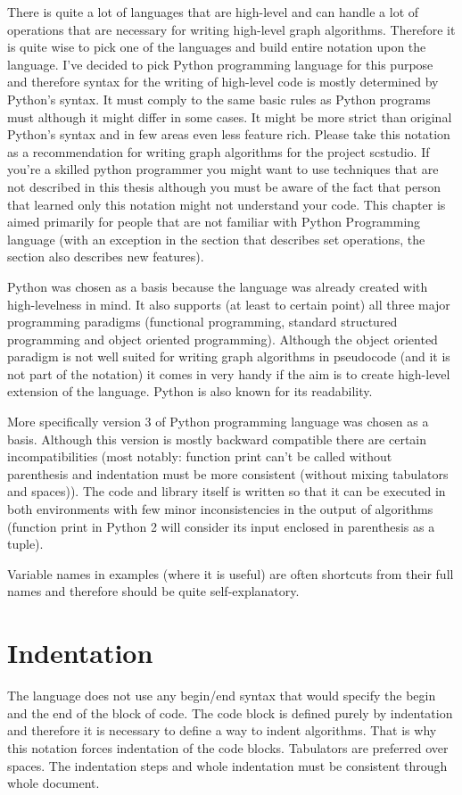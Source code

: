 \documentclass[11pt,oneside]{fithesis2}
\begin{document}
There is quite a lot of languages that are high-level and can handle a lot of operations that are necessary for writing high-level graph algorithms. Therefore it is quite wise to pick one of the languages and build entire notation upon the language. I've decided to pick Python programming language for this purpose and therefore syntax for the writing of high-level code is mostly determined by Python's syntax. It must comply to the same basic rules as Python programs must although it might differ in some cases. It might be more strict than original Python's syntax and in few areas even less feature rich. Please take this notation as a recommendation for writing graph algorithms for the project scstudio. If you're a skilled python programmer you might want to use techniques that are not described in this thesis although you must be aware of the fact that person that learned only this notation might not understand your code. This chapter is aimed primarily for people that are not familiar with Python Programming language (with an exception in the section that describes set operations, the section also describes new features).


Python was chosen as a basis because the language was already created with high-levelness in mind. It also supports (at least to certain point) all three major programming paradigms (functional programming, standard structured programming and object oriented programming). Although the object oriented paradigm is not well suited for writing graph algorithms in pseudocode (and it is not part of the notation) it comes in very handy if the aim is to create high-level extension of the language. Python is also known for its readability.

More specifically version 3 of Python programming language was chosen as a basis. Although this version is mostly backward compatible there are certain incompatibilities (most notably: function print can't be called without parenthesis and indentation must be more consistent (without mixing tabulators and spaces)). The code and library itself is written so that it can be executed in both environments with few minor inconsistencies in the output of algorithms (function print in Python 2 will consider its input enclosed in parenthesis as a tuple).

Variable names in examples (where it is useful) are often shortcuts from their full names and therefore should be quite self-explanatory.

\section{Indentation}
The language does not use any begin/end syntax that would specify the begin and the end of the block of code. The code block is defined purely by indentation and therefore it is necessary to define a way to indent algorithms. That is why this notation forces indentation of the code blocks. Tabulators are preferred over spaces. The indentation steps and whole indentation must be consistent through whole document.
\end{document}
